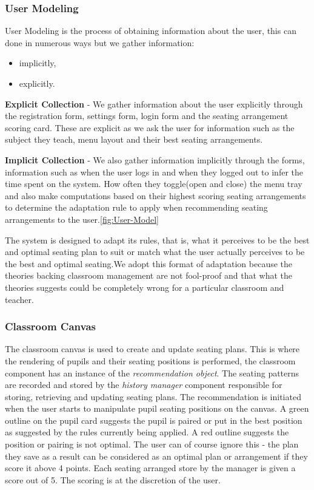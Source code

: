 \subsubsection{User Modeling}
User Modeling is the process of obtaining information about the user, this can done in numerous ways but we gather information:
\begin{itemize}
    \item  implicitly,
    \item  explicitly.
\end{itemize}

\textbf{Explicit Collection} - We gather information about the user explicitly through the registration form, settings form, login form and the seating arrangement scoring card. These are explicit as we ask the user for information such as the subject they teach, menu layout and their best seating arrangements.

\textbf{Implicit Collection} - We also gather information implicitly through the forms, information such as when the user logs in and when they logged out to infer the time spent on the system. How often they toggle(open and close) the menu tray and also make computations based on their highest scoring seating arrangements to determine the adaptation rule to apply when recommending seating arrangements to the user.\ref{fig:User-Model}

The system is designed to adapt its rules, that is, what it perceives to be the best and optimal seating plan to suit or match what the user actually perceives to be the best and optimal seating.We adopt this format of adaptation because the theories backing classroom management are not fool-proof and that what the theories suggests could be completely wrong for a particular classroom and teacher.

\subsubsection{Classroom Canvas}
The classroom canvas is used to create and update seating plans. This is where the rendering of pupils and their seating positions is performed, the classroom component has an instance of the \emph{recommendation object}. The seating patterns are recorded and stored by the \emph{history manager} component responsible for storing, retrieving and updating seating plans. The recommendation is initiated when the user starts to manipulate pupil seating positions on the canvas. A green outline on the pupil card suggests the pupil is paired or put in the best position as suggested by the rules currently being applied. A red outline suggests the position or pairing is not optimal. The user can of course ignore this - the plan they save as a result can be considered as an optimal plan or arrangement if they score it above 4 points. Each seating arranged store by the manager is given a score out of 5. The scoring is at the discretion of the user.

